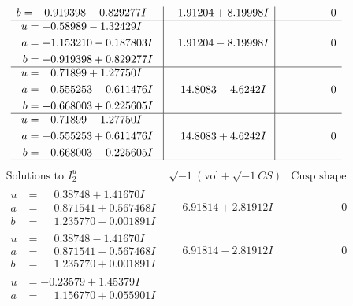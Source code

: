 \documentclass[1p]{elsarticle_modified}
\theoremstyle{definition}
\newcommand{\I}{\sqrt{-1}}
\begin{document}
$$\begin{array}{c|c|c}
\begin{aligned}
b &= -0.919398 - 0.829277 I\end{aligned}
 & \phantom{-}1.91204 + 8.19998 I & \phantom{-0.000000 } 0 \\ \hline\begin{aligned}
u &= -0.58989 - 1.32429 I \\
a &= -1.153210 - 0.187803 I \\
b &= -0.919398 + 0.829277 I\end{aligned}
 & \phantom{-}1.91204 - 8.19998 I & \phantom{-0.000000 } 0 \\ \hline\begin{aligned}
u &= \phantom{-}0.71899 + 1.27750 I \\
a &= -0.555253 - 0.611476 I \\
b &= -0.668003 + 0.225605 I\end{aligned}
 & \phantom{-}14.8083 - 4.6242 I & \phantom{-0.000000 } 0 \\ \hline\begin{aligned}
u &= \phantom{-}0.71899 - 1.27750 I \\
a &= -0.555253 + 0.611476 I \\
b &= -0.668003 - 0.225605 I\end{aligned}
 & \phantom{-}14.8083 + 4.6242 I & \phantom{-0.000000 } 0\\
 \hline 
 \end{array}$$\newpage$$\begin{array}{c|c|c}  
\text{Solutions to }I^u_{2}& \I (\text{vol} + \sqrt{-1}CS) & \text{Cusp shape}\\
 \hline 
\begin{aligned}
u &= \phantom{-}0.38748 + 1.41670 I \\
a &= \phantom{-}0.871541 + 0.567468 I \\
b &= \phantom{-}1.235770 - 0.001891 I\end{aligned}
 & \phantom{-}6.91814 + 2.81912 I & \phantom{-0.000000 } 0 \\ \hline\begin{aligned}
u &= \phantom{-}0.38748 - 1.41670 I \\
a &= \phantom{-}0.871541 - 0.567468 I \\
b &= \phantom{-}1.235770 + 0.001891 I\end{aligned}
 & \phantom{-}6.91814 - 2.81912 I & \phantom{-0.000000 } 0 \\ \hline\begin{aligned}
u &= -0.23579 + 1.45379 I \\
a &= \phantom{-}1.156770 + 0.055901 I \\

\end{aligned}
\end{array}$$
\end{document}

